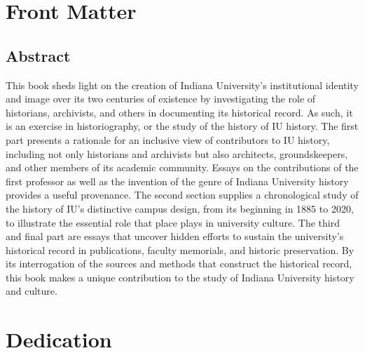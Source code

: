 \documentclass[
  american,
  letterpaper,
]{scrreprt}
\renewcommand*\contentsname{Table of contents}
\newcommand\contentsname{Table of contents}
\begin{document}

\renewcommand*\contentsname{Table of Contents}
{
\hypersetup{linkcolor=blue}
\setcounter{tocdepth}{2}
\tableofcontents
}
\listoffigures


\chapter*{Front Matter}\label{front-matter}


\section*{Abstract}\label{abstract}


This book sheds light on the creation of Indiana University's
institutional identity and image over its two centuries of existence by
investigating the role of historians, archivists, and others in
documenting its historical record. As such, it is an exercise in
historiography, or the study of the history of IU history. The first
part presents a rationale for an inclusive view of contributors to IU
history, including not only historians and archivists but also
architects, groundskeepers, and other members of its academic community.
Essays on the contributions of the first professor as well as the
invention of the genre of Indiana University history provides a useful
provenance. The second section supplies a chronological study of the
history of IU's distinctive campus design, from its beginning in 1885 to
2020, to illustrate the essential role that place plays in university
culture. The third and final part are essays that uncover hidden efforts
to sustain the university's historical record in publications, faculty
memorials, and historic preservation. By its interrogation of the
sources and methods that construct the historical record, this book
makes a unique contribution to the study of Indiana University history
and culture.


\chapter*{Dedication}\label{dedication}
\end{document}
